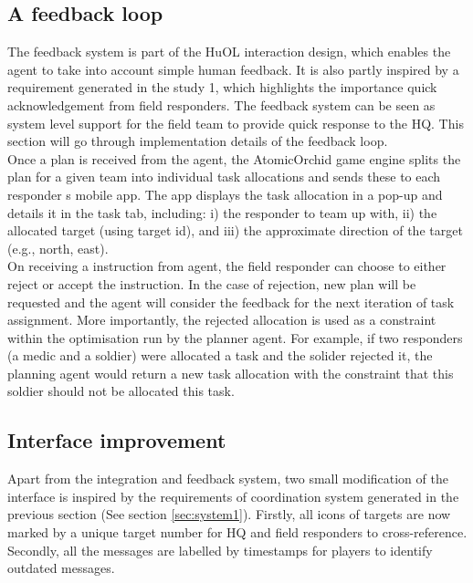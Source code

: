 \subsection{A feedback loop}
The feedback system is part of the HuOL interaction design, which enables the agent to take into account simple human feedback. It is also partly inspired by a requirement generated in the study 1, which highlights the importance quick acknowledgement from field responders. The feedback system can be seen as system level support for the field team to provide quick response to the HQ. This section will go through implementation details of the feedback loop.\\

Once a plan is received from the agent, the AtomicOrchid game engine splits the plan for a given team into individual task allocations and sends these to each responder s mobile app. The app displays the task allocation in a pop-up and details it in the task tab, including: i) the responder to team up with, ii) the allocated target (using target id), and iii) the approximate direction of the target (e.g., north, east).\\

On receiving a instruction from agent, the field responder can choose to either reject or accept the instruction. In the case of rejection, new plan will be requested and the agent will consider the feedback for the next iteration of task assignment. More importantly, the rejected allocation is used as a constraint within the optimisation run by the planner agent. For example, if two responders (a medic and a soldier) were allocated a task and the solider rejected it, the planning agent would return a new task allocation with the constraint that this soldier should not be allocated this task. \\

\subsection{Interface improvement}
Apart from the integration and feedback system, two small modification of the interface is inspired by the requirements of coordination system generated in the previous section (See section \ref{sec:system1}). Firstly, all icons of targets are now marked by a unique target number for HQ and field responders to cross-reference. Secondly, all the messages are labelled by timestamps for players to identify outdated messages.\\

